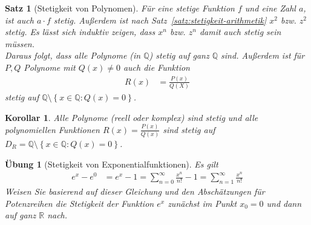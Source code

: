\documentclass[11pt, twoside, a4paper]{article}
\theoremstyle{plain}
\newtheorem{satz}[blockelement]{Satz}
\newtheorem{korollar}[blockelement]{Korollar}
\newtheorem{uebung}[blockelement]{Übung}
\newcommand{\set}[1]{\left\{#1\right\}}
\newcommand{\exclude}[0]{\setminus}
\newcommand{\R}{\mathbb{R}}
\newcommand{\K}{\mathbb{Q}}
\begin{document}

    \begin{satz}[Stetigkeit von Polynomen]
        \marginnote{[23. Jan]}
        Für eine stetige Funktion $f$ und eine Zahl $a$, ist auch $a\cdot f$ stetig. Außerdem ist nach Satz~\ref{satz:stetigkeit-arithmetik} $x^2$ bzw. $z^2$ stetig. Es lässt sich induktiv zeigen, dass $x^n$ bzw. $z^n$ damit auch stetig sein müssen.\\
        Daraus folgt, dass alle Polynome (in $\K$) stetig auf ganz $\K$ sind. Außerdem ist für $P,Q$ Polynome mit $Q(x)\neq 0$ auch die Funktion
        \begin{align*}
            R(x) &= \frac{P(x)}{Q(X)}
        \end{align*}
        stetig auf $\K\exclude\set{x\in\K: Q(x) = 0}$.
    \end{satz}

    \begin{korollar}
        Alle Polynome (reell oder komplex) sind stetig und alle polynomiellen Funktionen $R(x) = \frac{P(x)}{Q(x)}$ sind stetig auf $D_R = \K\exclude\set{x\in\K: Q(x) = 0}$.
    \end{korollar}

    \begin{uebung}[Stetigkeit von Exponentialfunktionen]
        Es gilt
        \begin{align*}
            e^x-e^0 &= e^x - 1 = \sum_{n=0}^{\infty} \frac{x^n}{n!}-1 = \sum_{n=1}^{\infty} \frac{x^n}{n!}
        \end{align*}
        Weisen Sie basierend auf dieser Gleichung und den Abschätzungen für Potenzreihen die Stetigkeit der Funktion $e^x$ zunächst im Punkt $x_0 = 0$ und dann auf ganz $\R$ nach.
    \end{uebung}
\end{document}

